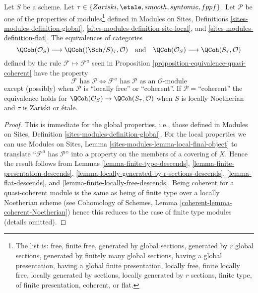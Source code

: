 \begin{lemma}
\label{lemma-equivalence-quasi-coherent-properties}
Let $S$ be a scheme.
Let $\tau \in \{Zariski, \linebreak[0] \etale, \linebreak[0]
smooth, \linebreak[0] syntomic, \linebreak[0] fppf\}$.
Let $\mathcal{P}$ be one of the properties of modules\footnote{The list is:
free, finite free, generated by global sections,
generated by $r$ global sections, generated by finitely many global sections,
having a global presentation, having a global finite presentation,
locally free, finite locally free, locally generated by sections,
locally generated by $r$ sections, finite type, of finite presentation,
coherent, or flat.} defined in
Modules on Sites, Definitions \ref{sites-modules-definition-global},
\ref{sites-modules-definition-site-local}, and
\ref{sites-modules-definition-flat}.
The equivalences of categories
$$
\QCoh(\mathcal{O}_S)
\longrightarrow
\QCoh((\Sch/S)_\tau, \mathcal{O})
\quad\text{and}\quad
\QCoh(\mathcal{O}_S)
\longrightarrow
\QCoh(S_\tau, \mathcal{O})
$$
defined by the rule $\mathcal{F} \mapsto \mathcal{F}^a$ seen in
Proposition \ref{proposition-equivalence-quasi-coherent}
have the property
$$
\mathcal{F}\text{ has }\mathcal{P}
\Leftrightarrow
\mathcal{F}^a\text{ has }\mathcal{P}\text{ as an }\mathcal{O}\text{-module}
$$
except (possibly) when $\mathcal{P}$ is ``locally free'' or ``coherent''.
If $\mathcal{P}=$``coherent'' the equivalence
holds for $\QCoh(\mathcal{O}_S) \to \QCoh(S_\tau, \mathcal{O})$
when $S$ is locally Noetherian and $\tau$ is Zariski or \'etale.
\end{lemma}

\begin{proof}
This is immediate for the global properties, i.e., those defined in
Modules on Sites, Definition \ref{sites-modules-definition-global}.
For the local properties we can use
Modules on Sites, Lemma \ref{sites-modules-lemma-local-final-object}
to translate ``$\mathcal{F}^a$ has $\mathcal{P}$'' into a property
on the members of a covering of $X$. Hence the result follows from
Lemmas \ref{lemma-finite-type-descends},
\ref{lemma-finite-presentation-descends},
\ref{lemma-locally-generated-by-r-sections-descends},
\ref{lemma-flat-descends}, and
\ref{lemma-finite-locally-free-descends}.
Being coherent for a quasi-coherent module is the same as being
of finite type over a locally Noetherian scheme (see
Cohomology of Schemes, Lemma \ref{coherent-lemma-coherent-Noetherian})
hence this reduces
to the case of finite type modules (details omitted).
\end{proof}










